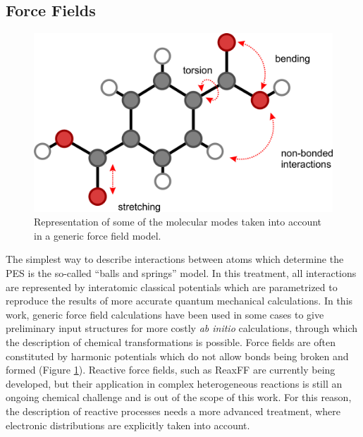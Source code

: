 \subsection*{Force Fields}

\begin{figure}[!htbp]
	\centering
 	\includegraphics[width=1.0\textwidth]{forcefield}
	\caption{Representation of some of the molecular modes taken into account in a generic force field model.}
	\label{fig:forcefield}
\end{figure}

The simplest way to describe interactions between atoms which determine the PES is the so-called ``balls and springs'' model. In this treatment, all interactions are represented by interatomic classical potentials which are parametrized to reproduce the results of more accurate quantum mechanical calculations. In this work, generic force field calculations have been used in some cases to give preliminary input structures for more costly \textit{ab initio} calculations, through which the description of chemical transformations is possible. 
Force fields are often constituted by harmonic potentials which do not allow bonds being broken and formed (Figure \ref{fig:forcefield}). Reactive force fields, such as ReaxFF \cite{VanDuin2001} are currently being developed, but their application in complex heterogeneous reactions is still an ongoing chemical challenge and is out of the scope of this work. For this reason, the description of reactive processes needs a more advanced treatment, where electronic distributions are explicitly taken into account.

